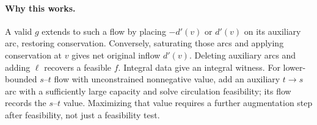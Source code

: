 \paragraph{Why this works.}
A valid $g$ extends to such a flow by placing $-d'(v)$ or $d'(v)$ on its
auxiliary arc, restoring conservation. Conversely, saturating those arcs
and applying conservation at $v$ gives net original inflow $d'(v)$.
Deleting auxiliary arcs and adding $\ell$ recovers a feasible $f$.
Integral data give an integral witness. For lower-bounded $s$--$t$ flow with
unconstrained nonnegative value, add an auxiliary $t\to s$ arc with a
sufficiently large capacity and solve circulation feasibility; its flow
records the $s$--$t$ value. Maximizing that value requires a further
augmentation step after feasibility, not just a feasibility test.

